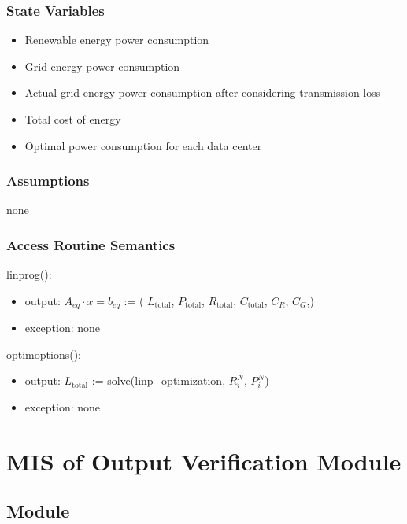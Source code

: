 \documentclass[12pt, titlepage]{article}
\begin{document}
\subsubsection{State Variables}
\begin{itemize}
    \item Renewable energy power consumption 
    \item Grid energy power consumption 
    \item Actual grid energy power consumption after considering transmission loss
    \item Total cost of energy
    \item Optimal power consumption for each data center
\end{itemize}


\subsubsection{Assumptions}

none

\subsubsection{Access Routine Semantics}

linprog(): 
\renewcommand*{\arraystretch}{1.5}
\begin{itemize}
\item output:
$A_{eq} \cdot x = b_{eq}$ := ( $L_\text{total}$,
$P_\text{total}$, $R_\text{total}$, $C_\text{total}$, $C_R$, $C_G$,)\\
\item exception: none

\end{itemize}

optimoptions(): 
\renewcommand*{\arraystretch}{1.5}
\begin{itemize}
\item output: $L_\text{total}$ := solve(linp\_optimization,
$R_i^N$, $P_i^N$)\\
\item exception: none

\end{itemize}
\newpage


\section{MIS of Output Verification Module} \label{VerifyOutput}

\subsection{Module}
\end{document}

